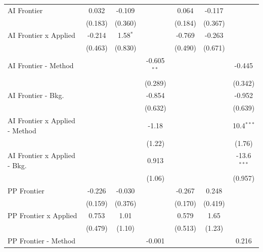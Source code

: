 \begin{tabular}{lcccccc}
   AI Frontier                    & 0.032   & -0.109       &               & 0.064       & -0.117        &   \\   
                                  & (0.183) & (0.360)      &               & (0.184)     & (0.367)       &   \\   
   AI Frontier x Applied          & -0.214  & 1.58$^{*}$   &               & -0.769      & -0.263        &   \\   
                                  & (0.463) & (0.830)      &               & (0.490)     & (0.671)       &   \\   
   AI Frontier - Method           &         &              & -0.605$^{**}$ &             &               & -0.445\\   
                                  &         &              & (0.289)       &             &               & (0.342)\\   
   AI Frontier - Bkg.             &         &              & -0.854        &             &               & -0.952\\   
                                  &         &              & (0.632)       &             &               & (0.639)\\   
   AI Frontier x Applied - Method &         &              & -1.18         &             &               & 10.4$^{***}$\\   
                                  &         &              & (1.22)        &             &               & (1.76)\\   
   AI Frontier x Applied - Bkg.   &         &              & 0.913         &             &               & -13.6$^{***}$\\   
                                  &         &              & (1.06)        &             &               & (0.957)\\   
   PP Frontier                    & -0.226  & -0.030       &               & -0.267      & 0.248         &   \\   
                                  & (0.159) & (0.376)      &               & (0.170)     & (0.419)       &   \\   
   PP Frontier x Applied          & 0.753   & 1.01         &               & 0.579       & 1.65          &   \\   
                                  & (0.479) & (1.10)       &               & (0.513)     & (1.23)        &   \\   
   PP Frontier - Method           &         &              & -0.001        &             &               & 0.216\\   

\end{tabular}
